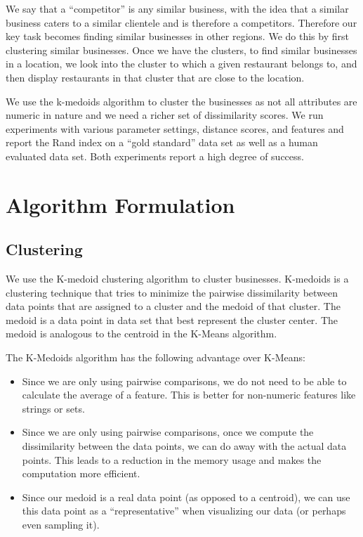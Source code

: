 \documentclass{article}
\begin{document}
   We say that a ``competitor'' is any similar business, with the idea that a similar business caters to a similar clientele and is therefore a competitors.
   Therefore our key task becomes finding similar businesses in other regions.
   We do this by first clustering similar businesses.
   Once we have the clusters, to find similar businesses in a location, we look into the cluster to which a given restaurant belongs to, and then display restaurants in that cluster that are close to the location.  

   We use the k-medoids algorithm to cluster the businesses as not all attributes are numeric in nature and we need a richer set of dissimilarity scores.
   We run experiments with various parameter settings, distance scores, and features and report the Rand index on a ``gold standard'' data set as well as a human evaluated data set.
   Both experiments report a high degree of success.

\section{Algorithm Formulation}

   \subsection{Clustering}
      We use the K-medoid clustering algorithm to cluster businesses.
      K-medoids is a clustering technique that tries to minimize the pairwise dissimilarity between data points that are assigned to a cluster and the medoid of that cluster.
      The medoid is a data point in data set that best represent the cluster center.
      The medoid is analogous to the centroid in the K-Means algorithm.

      The K-Medoids algorithm has the following advantage over K-Means:
      \begin{itemize} 
         \setlength\itemsep{0.1cm}
         \item
            Since we are only using pairwise comparisons, we do not need to be able to calculate the average of a feature.
            This is better for non-numeric features like strings or sets.
         \item
            Since we are only using pairwise comparisons, once we compute the dissimilarity between the data points, we can do away with the actual data points.
            This leads to a reduction in the memory usage and makes the computation more efficient.
         \item
            Since our medoid is a real data point (as opposed to a centroid), we can use this data point as a ``representative'' when visualizing our data (or perhaps even sampling it).
      \end{itemize}
\end{document}
